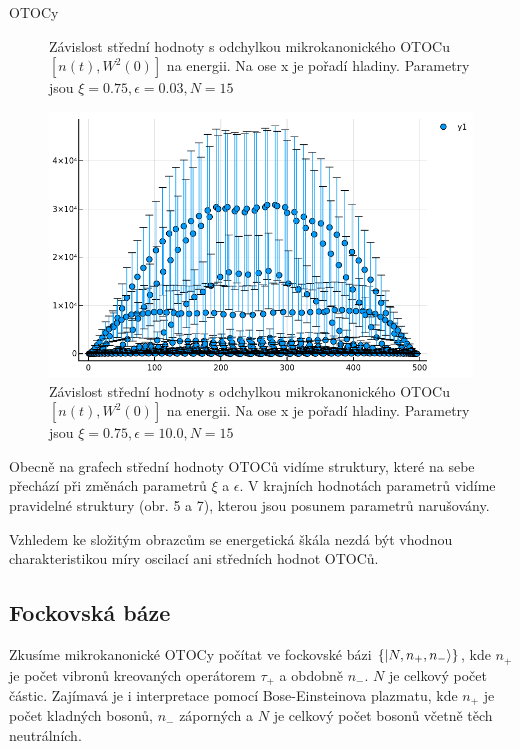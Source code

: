 \documentclass{article}
\begin{document}
\begin{section}{OTOCy}
\begin{figure}[H]
                \caption{Závislost střední hodnoty s odchylkou mikrokanonického 
                 OTOCu $[n(t),W^2(0)]$ na energii. Na ose x je pořadí hladiny. Parametry jsou $\xi = 0.75, \epsilon = 0.03, N = 15$}
            \end{figure}

            \begin{figure}[H]
                \begin{center}
                    \includegraphics[width=12cm]{Mean 10.png}
                \end{center}
                
                \caption{Závislost střední hodnoty s odchylkou mikrokanonického 
                 OTOCu $[n(t),W^2(0)]$ na energii. Na ose x je pořadí hladiny. Parametry jsou $\xi = 0.75, \epsilon = 10.0, N = 15$}
            \end{figure}

            Obecně na grafech střední hodnoty OTOCů vidíme struktury, které na sebe přechází při změnách parametrů $\xi$ a $\epsilon$. 
            V krajních hodnotách parametrů vidíme pravidelné struktury (obr. 5 a 7), kterou jsou posunem parametrů narušovány.

            Vzhledem ke složitým obrazcům se energetická škála nezdá být vhodnou charakteristikou míry oscilací ani středních hodnot 
            OTOCů.

\subsection{Fockovská báze}

            Zkusíme mikrokanonické OTOCy počítat ve fockovské bázi $\{\ket{N,n_+,n_-}\}$, kde $n_+$ je počet vibronů 
            kreovaných operátorem $\tau_+$ a obdobně $n_-$. $N$ je celkový počet částic. Zajímavá je i interpretace pomocí 
            Bose-Einsteinova plazmatu, kde $n_+$ je počet kladných bosonů, $n_-$ záporných a $N$ je celkový počet 
            bosonů včetně těch neutrálních.


\end{section}
\end{document}
